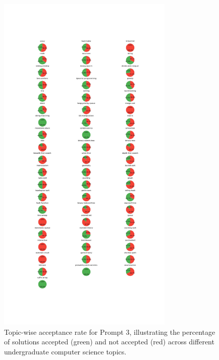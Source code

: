 \begin{figure}[H]
    \centering
    \includegraphics[width=0.75\textwidth, height=0.7\textheight]{figures/3/accepted_not_topicwise.jpg}
    \caption{Topic-wise acceptance rate for Prompt 3, illustrating the percentage of solutions accepted (green) and not accepted (red) across different undergraduate computer science topics.}
    \label{fig:topic_wise_acceptance_prompt_3}
\end{figure}

